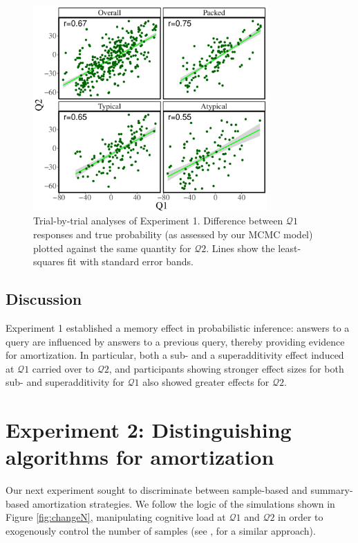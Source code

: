\begin{figure}
\centering
\includegraphics[width=0.8\textwidth]{figures/exp1correspondence.pdf}
\caption{Trial-by-trial analyses of Experiment 1. Difference between $\mathcal{Q}1$ responses and true probability (as assessed by our MCMC model) plotted against the same quantity for $\mathcal{Q}2$. Lines show the least-squares fit with standard error bands.}
\label{fig:correspondence1}
\end{figure}

\subsection{Discussion}

Experiment 1 established a memory effect in probabilistic inference: answers to a query are influenced by answers to a previous query, thereby providing evidence for amortization. In particular, both a sub- and a superadditivity effect induced at $\mathcal{Q}1$ carried over to $\mathcal{Q}2$, and participants showing stronger effect sizes for both sub- and superadditivity for $\mathcal{Q}1$ also showed greater effects for $\mathcal{Q}2$. 

\section{Experiment 2: Distinguishing algorithms for amortization}

Our next experiment sought to discriminate between sample-based and summary-based amortization strategies. We follow the logic of the simulations shown in Figure \ref{fig:changeN}, manipulating cognitive load at $\mathcal{Q}1$ and $\mathcal{Q}2$ in order to exogenously control the number of samples (see \citet{thaker17,dasgupta17}, for a similar approach). 

